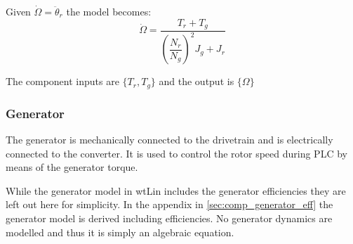 Given $ \dot{\Omega} = \ddot{\theta}_r $ the model becomes:
\begin{equation}\label{key}
	 \dot{\Omega} = \dfrac{T_{r} + T_{g}}{\left(\dfrac{N_r}{N_g}\right)^2 J_{g} + J_{r}}
\end{equation}

The component inputs are $ \{T_r, T_g\} $ and the output is $ \{\Omega\} $ 



\subsubsection{Generator} \label{sec:comp_generator}
The generator is mechanically connected to the drivetrain and is electrically connected to the converter. It is used to control the rotor speed during PLC by means of the generator torque. 

While the generator model in wtLin includes the generator efficiencies they are left out here for simplicity. In the appendix in \cref{sec:comp_generator_eff} the generator model is derived including efficiencies. No generator dynamics are modelled and thus it is simply an algebraic equation.


